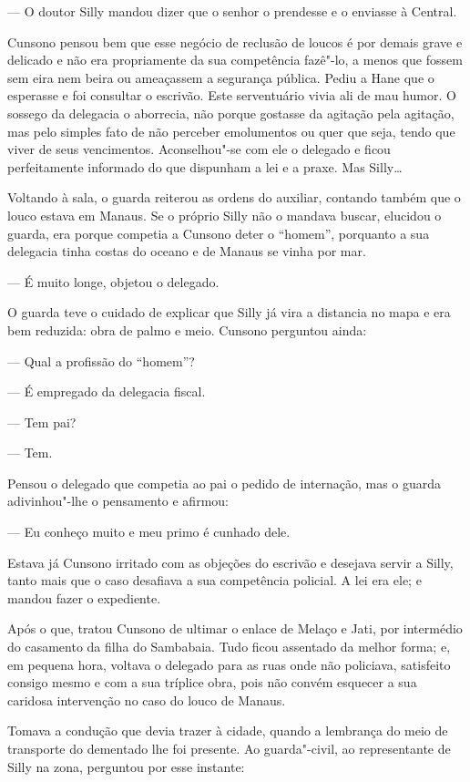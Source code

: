 --- O doutor Silly mandou dizer que o senhor o prendesse e o enviasse à
Central.

Cunsono pensou bem que esse negócio de reclusão de loucos é por demais
grave e delicado e não era propriamente da sua competência fazê"-lo, a
menos que fossem sem eira nem beira ou ameaçassem a segurança pública.
Pediu a Hane que o esperasse e foi consultar o escrivão. Este
serventuário vivia ali de mau humor. O sossego da delegacia o aborrecia,
não porque gostasse da agitação pela agitação, mas pelo simples fato de
não perceber emolumentos ou quer que seja, tendo que viver de seus
vencimentos. Aconselhou"-se com ele o delegado e ficou perfeitamente
informado do que dispunham a lei e a praxe. Mas Silly\ldots{}

Voltando à sala, o guarda reiterou as ordens do auxiliar, contando
também que o louco estava em Manaus. Se o próprio Silly não o mandava
buscar, elucidou o guarda, era porque competia a Cunsono deter o
``homem'', porquanto a sua delegacia tinha costas do oceano e de Manaus se
vinha por mar.

--- É muito longe, objetou o delegado.

O guarda teve o cuidado de explicar que Silly já vira a distancia no
mapa e era bem reduzida: obra de palmo e meio. Cunsono perguntou ainda:

--- Qual a profissão do ``homem''?

--- É empregado da delegacia fiscal.

--- Tem pai?

--- Tem.

Pensou o delegado que competia ao pai o pedido de internação, mas o
guarda adivinhou"-lhe o pensamento e afirmou:

--- Eu conheço muito e meu primo é cunhado dele.

Estava já Cunsono irritado com as objeções do escrivão e desejava servir
a Silly, tanto mais que o caso desafiava a sua competência policial. A
lei era ele; e mandou fazer o expediente.

Após o que, tratou Cunsono de ultimar o enlace de Melaço e Jati, por
intermédio do casamento da filha do Sambabaia. Tudo ficou assentado da
melhor forma; e, em pequena hora, voltava o delegado para as ruas onde
não policiava, satisfeito consigo mesmo e com a sua tríplice obra, pois
não convém esquecer a sua caridosa intervenção no caso do louco de
Manaus.

Tomava a condução que devia trazer à cidade, quando a lembrança do meio
de transporte do dementado lhe foi presente. Ao guarda"-civil, ao
representante de Silly na zona, perguntou por esse instante:


